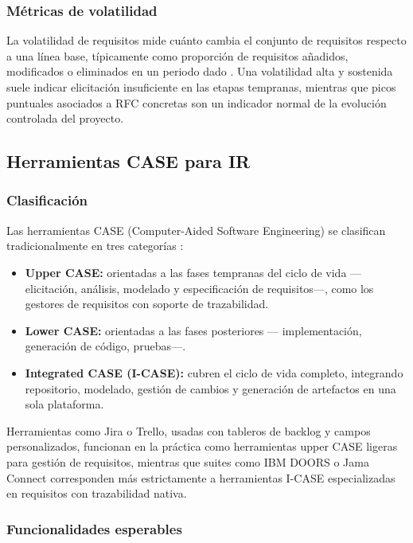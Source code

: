 \documentclass[11pt,a4paper]{article}
\begin{document}
\subsubsection{Métricas de volatilidad}
 
La volatilidad de requisitos mide cuánto cambia el conjunto de requisitos
respecto a una línea base, típicamente como proporción de requisitos
añadidos, modificados o eliminados en un periodo dado
\cite{pohl2025, wiegers2013}. Una volatilidad alta y sostenida suele
indicar elicitación insuficiente en las etapas tempranas, mientras que
picos puntuales asociados a RFC concretas son un indicador normal de la
evolución controlada del proyecto.
 

\subsection{Herramientas CASE para IR}
\subsubsection{Clasificación}
 
Las herramientas CASE (Computer-Aided Software Engineering) se clasifican
tradicionalmente en tres categorías \cite{swebok_v4, pohl2025}:
 
\begin{itemize}
  \item \textbf{Upper CASE:} orientadas a las fases tempranas del ciclo de
  vida --- elicitación, análisis, modelado y especificación de
  requisitos---, como los gestores de requisitos con soporte de
  trazabilidad.
  \item \textbf{Lower CASE:} orientadas a las fases posteriores ---
  implementación, generación de código, pruebas---.
  \item \textbf{Integrated CASE (I-CASE):} cubren el ciclo de vida
  completo, integrando repositorio, modelado, gestión de cambios y
  generación de artefactos en una sola plataforma.
\end{itemize}
 
Herramientas como Jira o Trello, usadas con tableros de backlog y campos
personalizados, funcionan en la práctica como herramientas upper CASE
ligeras para gestión de requisitos, mientras que suites como IBM DOORS o
Jama Connect corresponden más estrictamente a herramientas I-CASE
especializadas en requisitos con trazabilidad nativa.
 
\subsubsection{Funcionalidades esperables}
 
\end{document}
